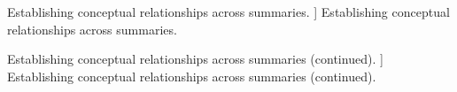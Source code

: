 \begin{table}
    \centering
    \caption
    [
        Establishing conceptual relationships across summaries.
    ]
    {
        Establishing conceptual relationships across summaries.
    }
    \label{table:sum-tab}
    \centering
\end{table}



\begin{table}
    \centering
    \caption
    [
        Establishing conceptual relationships across summaries (continued).
    ]
    {
        Establishing conceptual relationships across summaries (continued).
    }
    \label{table:sum-tab-2}
    \centering
\end{table}


